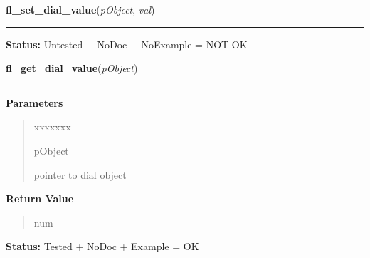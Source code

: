     \label{xformslib:library:fl_set_dial_value}

    \vspace{0.5ex}

\hspace{.8\funcindent}\begin{boxedminipage}{\funcwidth}

    \raggedright \textbf{fl\_set\_dial\_value}(\textit{pObject}, \textit{val})

    \vspace{-1.5ex}

    \rule{\textwidth}{0.5\fboxrule}
\setlength{\parskip}{2ex}
\setlength{\parskip}{1ex}
\textbf{Status:} Untested + NoDoc + NoExample = NOT OK



    \end{boxedminipage}

    \label{xformslib:library:fl_get_dial_value}

    \vspace{0.5ex}

\hspace{.8\funcindent}\begin{boxedminipage}{\funcwidth}

    \raggedright \textbf{fl\_get\_dial\_value}(\textit{pObject})

    \vspace{-1.5ex}

    \rule{\textwidth}{0.5\fboxrule}
\setlength{\parskip}{2ex}
\setlength{\parskip}{1ex}
      \textbf{Parameters}
      \vspace{-1ex}

      \begin{quote}
        \begin{Ventry}{xxxxxxx}

          \item[pObject]

          pointer to dial object

        \end{Ventry}

      \end{quote}

      \textbf{Return Value}
    \vspace{-1ex}

      \begin{quote}
      num

      \end{quote}

\textbf{Status:} Tested + NoDoc + Example = OK



    \end{boxedminipage}

